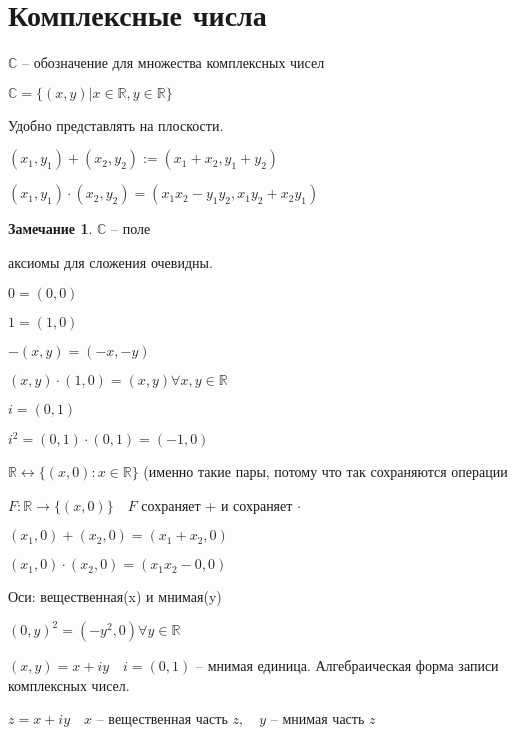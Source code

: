 \documentclass{book}
\newcommand\R{\ensuremath{\mathbb{R}}}
\renewcommand\C{\ensuremath{\mathbb{C}}}
\theoremstyle{definition}
\newtheorem*{note}{Замечание}
\begin{document}
        \section{Комплексные числа}
        $\C$ -- обозначение для множества комплексных чисел

        $\C = \{(x,y)|x\in \R, y\in \R\}$

        Удобно представлять на плоскости.

        $(x_1,y_1) + (x_2,y_2) := (x_1+x_2,y_1+y_2)$

        $(x_1,y_1)\cdot (x_2,y_2) = (x_1x_2-y_1y_2,x_1y_2+x_2y_1) $
        \begin{note}
            $\C$ -- поле

            аксиомы для сложения очевидны.

            $0 = (0,0)$

            $1 = (1,0)$

            $-(x,y) = (-x,-y)$

            $(x,y) \cdot  (1,0) = (x,y) \forall x, y\in \R$

            $i = (0,1)$

            $i^2 = (0,1) \cdot  (0,1) = (-1,0)$
        \end{note}

        $\R \leftrightarrow \{(x,0) : x\in \R\}$ (именно такие пары, потому что так сохраняются операции

        $F: \R \to \{(x,0)\}\quad F$ сохраняет + и сохраняет $\cdot $ 

        $(x_1,0) + (x_2,0) = (x_1+x_2,0)$

        $(x_1, 0) \cdot  (x_2,0) = (x_1x_2-0,0)$



        Оси: вещественная(x) и мнимая(y)

        $(0,y)^2 = (-y^2,0) \forall y\in \R$

        $(x,y) = x+iy\quad i = (0,1)$ -- мнимая единица. Алгебраическая форма записи комплексных чисел.

        $z = x+iy\quad x$ -- вещественная часть $z,\quad y$ -- мнимая часть $z$
\end{document}
